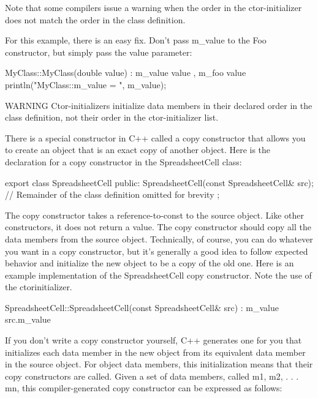 Note that some compilers issue a warning when the order in the ctor-initializer does not match the order in the class definition.

For this example, there is an easy fix. Don’t pass m\_value to the Foo constructor, but simply pass the value parameter:

\begin{cpp}
MyClass::MyClass(double value) : m_value { value }, m_foo { value }
{
    println("MyClass::m_value = {}", m_value);
}
\end{cpp}

\begin{myWarning}{WARNING}
Ctor-initializers initialize data members in their declared order in the class definition, not their order in the ctor-initializer list.
\end{myWarning}


There is a special constructor in C++ called a copy constructor that allows you to create an object that is an exact copy of another object. Here is the declaration for a copy constructor in the SpreadsheetCell class:

\begin{cpp}
export class SpreadsheetCell
{
    public:
        SpreadsheetCell(const SpreadsheetCell& src);
        // Remainder of the class definition omitted for brevity
};
\end{cpp}

The copy constructor takes a reference-to-const to the source object. Like other constructors, it does not return a value. The copy constructor should copy all the data members from the source object. Technically, of course, you can do whatever you want in a copy constructor, but it’s generally a good idea to follow expected behavior and initialize the new object to be a copy of the old one. Here is an example implementation of the SpreadsheetCell copy constructor. Note the use of the ctorinitializer.

\begin{cpp}
SpreadsheetCell::SpreadsheetCell(const SpreadsheetCell& src)
: m_value { src.m_value }
{}
\end{cpp}

If you don’t write a copy constructor yourself, C++ generates one for you that initializes each data member in the new object from its equivalent data member in the source object. For object data members, this initialization means that their copy constructors are called. Given a set of data members, called m1, m2, . . . mn, this compiler-generated copy constructor can be expressed as follows:

